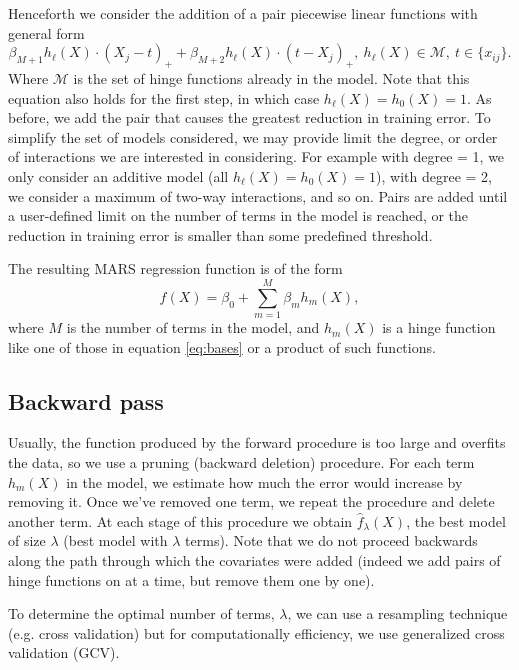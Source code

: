\documentclass[12pt]{article}
\begin{document}
Henceforth we consider the addition of a pair piecewise linear functions with general form
\begin{equation} \label{eq:gen-pairs-add}
  \beta_{M + 1} h_{\ell}(X) \cdot (X_{j} - t)_{+} + \beta_{M + 2} h_{\ell}(X) \cdot (t - X_{j})_{+}, \ h_{\ell}(X) \in \mathcal{M}, \ t \in \{x_{ij}\}.
\end{equation}
Where $\mathcal{M}$ is the set of hinge functions already in the model. Note that this equation also holds for the first step, in which case $h_{\ell}(X) = h_{0}(X) = 1$. As before, we add the pair that causes the greatest reduction in training error. To simplify the set of models considered, we may provide limit the degree, or order of interactions we are interested in considering. For example with degree = 1, we only consider an additive model (all $h_{\ell}(X) = h_{0}(X) = 1$), with degree = 2, we consider a maximum of two-way interactions, and so on.
Pairs are added until a user-defined limit on the number of terms in the model is reached, or the reduction in training error is smaller than some predefined threshold.

The resulting MARS regression function is of the form
\begin{equation}
  f(X) = \beta_{0} + \sum_{m = 1}^{M} \beta_{m} h_{m}(X),
\end{equation}
where $M$ is the number of terms in the model, and $h_{m}(X)$ is a hinge function like one of those in equation \ref{eq:bases} or a product of such functions.


\subsection{Backward pass} %
\label{sub:backward_pass}

Usually, the function produced by the forward procedure is too large and overfits the data, so we use a pruning (backward deletion) procedure. For each term $h_{m}(X)$ in the model, we estimate how much the error would increase by removing it. Once we've removed one term, we repeat the procedure and delete another term. At each stage of this procedure we obtain $\hat{f}_{\lambda}(X)$, the best model of size $\lambda$ (best model with $\lambda$ terms). Note that we do not proceed backwards along the path through which the covariates were added (indeed we add pairs of hinge functions on at a time, but remove them one by one). 

To determine the optimal number of terms, $\lambda$, we can use a resampling technique (e.g. cross validation) but for computationally efficiency, we use generalized cross validation (GCV).
\end{document}
